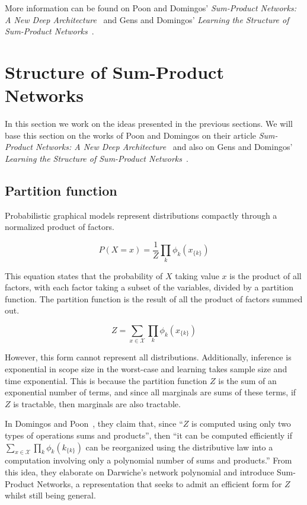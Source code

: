 \documentclass[a4paper,10pt]{article}
\theoremstyle{plain}
\begin{document}
More information can be found on Poon and Domingos' \textit{Sum-Product Networks: A New Deep
Architecture}~\cite{poon-domingos} and Gens and Domingos' \textit{Learning the Structure of
Sum-Product Networks}~\cite{gens-domingos}.

\newpage

\section{Structure of Sum-Product Networks}

In this section we work on the ideas presented in the previous sections. We will base this section
on the works of Poon and Domingos on their article \textit{Sum-Product Networks: A New Deep
Architecture}~\cite{poon-domingos} and also on Gens and Domingos' \textit{Learning the Structure of
Sum-Product Networks}~\cite{gens-domingos}.

\subsection{Partition function}

Probabilistic graphical models represent distributions compactly through a normalized product of
factors.

\begin{equation*}
  P(X=x) = \frac{1}{Z}\prod_k \phi_k (x_{\{k\}})
\end{equation*}

This equation states that the probability of $X$ taking value $x$ is the product of all factors,
with each factor taking a subset of the variables, divided by a partition function. The partition
function is the result of all the product of factors summed out.

\begin{equation*}
  Z = \sum_{x\in \mathcal{X}} \prod_k \phi_k(x_{\{k\}})
\end{equation*}

However, this form cannot represent all distributions. Additionally, inference is exponential in
scope size in the worst-case and learning takes sample size and time exponential. This is because
the partition function $Z$ is the sum of an exponential number of terms, and since all marginals
are sums of these terms, if $Z$ is tractable, then marginals are also tractable.

In Domingos and Poon~\cite{poon-domingos}, they claim that, since ``$Z$ is computed using only two
types of operations sums and products'', then ``it can be computed efficiently if $\sum_{x\in
\mathcal{X}} \prod_k \phi_k (k_{\{k\}})$ can be reorganized using the distributive law into a
computation involving only a polynomial number of sums and products.'' From this idea, they
elaborate on Darwiche's network polynomial and introduce Sum-Product Networks, a representation
that seeks to admit an efficient form for $Z$ whilst still being general.
\end{document}
